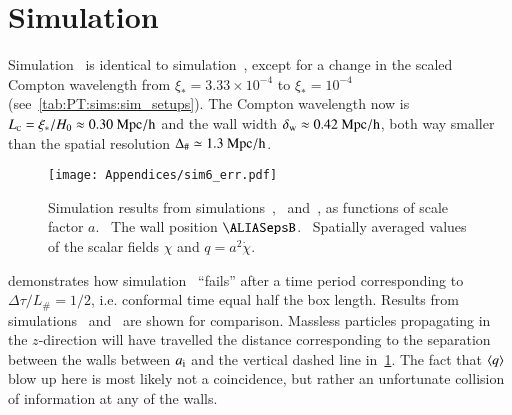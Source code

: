 




\newcommand\Ft{\ALIASFt}
\newcommand\ah{\ALIASah}
\newcommand\lcoord{\ALIASlcoord}
\newcommand\lcoordx{\ALIASlcoordx}
\newcommand\lcoordk{\ALIASlcoordk}
\newcommand\hpA{\ALIAShpA}
\newcommand\hpB{\ALIAShpB}
\newcommand\hpC{\ALIAShpC}
\newcommand\hpAB{\ALIAShpAB}
\newcommand\hpCR{\ALIAShpCR}
\newcommand\hpCI{\ALIAShpCI}
\newcommand\epsA{\ALIASepsA}
\newcommand\epsB{\ALIASepsB}
\newcommand\epsC{\ALIASepsC}






\section{Simulation~}\label{app:misc:sim6}
    Simulation~ is identical to simulation~, except for a change in the scaled Compton wavelength from $\xi_\ast=3.33\times 10^{-4}$ to $\xi_\ast = 10^{-4}$ (see~\cref{tab:PT:sims:sim_setups}). %
    The Compton wavelength now is $L_{\text{\tiny{C}}} = \xi_\ast/H_0 \approx 0.30~\mathrm{Mpc/h}$ and the wall width $\delta_\mathrm{w}\approx 0.42~\mathrm{Mpc/h}$, both way smaller than the spatial resolution $\Delta_\# \simeq 1.3~\mathrm{Mpc/h}$. %
    \begin{figure}[hb]
        \centering
        \texttt{[image: Appendices/sim6\_err.pdf]}
        \caption{Simulation results from simulations~,~ and~, as functions of scale factor $a$. ~The wall position $\epsB$. ~Spatially averaged values of the scalar fields $\chi$ and $q=a^2 \dot{\chi}$.}
        \label{fig:misc:sim6:sim6_err}
    \end{figure}%
     demonstrates how simulation~ ``fails'' after a time period corresponding to $\Delta \tau/L_\#= 1/2$, i.e. conformal time equal half the box length. Results from simulations~ and~ are shown for comparison. %
    Massless particles propagating in the $z$-direction will have travelled the distance corresponding to the separation between the walls between $a_\mathrm{i}$ and the vertical dashed line in~\cref{fig:misc:sim6:sim6_err}. The fact that $\left\langle{q}\right\rangle$ blow up here is most likely not a coincidence, but rather an unfortunate collision of information at any of the walls.  




